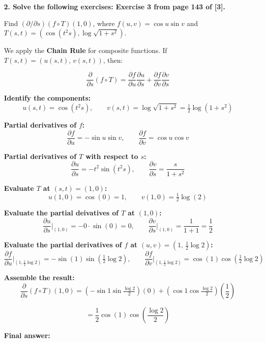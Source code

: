 \textbf{2. Solve the following exercises: Exercise 3 from page 143 of [3].}

Find $(\partial/\partial s)(f \circ T)(1, 0)$, where $f(u, v) = \cos u \operatorname{sin} v$ and $T(s, t) = (\cos(t^2 s), \log \sqrt{1 + s^2})$.
\begin{respuesta}
    We apply the \textbf{Chain Rule} for composite functions. If $T(s,t) = (u(s,t),\, v(s,t))$, then:

    \[
    \frac{\partial}{\partial s}(f \circ T) = \frac{\partial f}{\partial u}\frac{\partial u}{\partial s} + \frac{\partial f}{\partial v}\frac{\partial v}{\partial s}
    \]

    \textbf{Identify the components:}
    \[
    u(s,t) = \cos(t^2 s), \qquad v(s,t) = \log\sqrt{1+s^2} = \tfrac{1}{2}\log(1+s^2)
    \]

    \textbf{Partial derivatives of $f$:}
    \[
    \frac{\partial f}{\partial u} = -\sin u \sin v, \qquad \frac{\partial f}{\partial v} = \cos u \cos v
    \]

    \textbf{Partial derivatives of $T$ with respect to $s$:}
    \[
    \frac{\partial u}{\partial s} = -t^2 \sin(t^2 s), \qquad \frac{\partial v}{\partial s} = \frac{s}{1+s^2}
    \]

    \textbf{Evaluate $T$ at $(s,t) = (1,0)$:}
    \[
    u(1,0) = \cos(0) = 1, \qquad v(1,0) = \tfrac{1}{2}\log(2)
    \]

    \textbf{Evaluate the partial deivatives of $T$ at $(1,0)$:}
    \[
    \frac{\partial u}{\partial s}\Big|_{(1,0)} = -0\cdot\sin(0) = 0, \qquad \frac{\partial v}{\partial s}\Big|_{(1,0)} = \frac{1}{1+1} = \frac{1}{2}
    \]

    \textbf{Evaluate the partial derivatives of $f$ at $(u,v) = (1,\,\tfrac{1}{2}\log 2)$:}
    \[
    \frac{\partial f}{\partial u}\Big|_{(1,\frac{1}{2}\log 2)} = -\sin(1)\sin\!\left(\tfrac{1}{2}\log 2\right), \qquad
    \frac{\partial f}{\partial v}\Big|_{(1,\frac{1}{2}\log 2)} = \cos(1)\cos\!\left(\tfrac{1}{2}\log 2\right)
    \]

    \textbf{Assemble the result:}
    \[
    \frac{\partial}{\partial s}(f\circ T)(1,0) = \left(-\sin 1\sin\tfrac{\log 2}{2}\right)(0) + \left(\cos 1\cos\tfrac{\log 2}{2}\right)\!\left(\frac{1}{2}\right)
    \]

    \[
    = \frac{1}{2}\cos(1)\cos\!\left(\frac{\log 2}{2}\right)
    \]

    \textbf{Final answer:}
    \begin{center}
    \end{center}
\end{respuesta}












